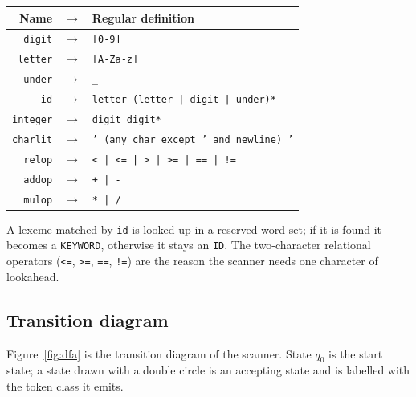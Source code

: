 \documentclass[11pt]{article}
\begin{document}
\begin{center}
\begin{tabular}{@{}rcl@{}}
\toprule
\textbf{Name} & $\rightarrow$ & \textbf{Regular definition}\\
\midrule
\texttt{digit}    & $\rightarrow$ & \texttt{[0-9]}\\
\texttt{letter}   & $\rightarrow$ & \texttt{[A-Za-z]}\\
\texttt{under}    & $\rightarrow$ & \texttt{\_}\\
\texttt{id}       & $\rightarrow$ & \texttt{letter (letter | digit | under)*}\\
\texttt{integer}  & $\rightarrow$ & \texttt{digit digit*}\\
\texttt{charlit}  & $\rightarrow$ & \texttt{' (any char except ' and newline) '}\\
\texttt{relop}    & $\rightarrow$ & \texttt{< | <= | > | >= | == | !=}\\
\texttt{addop}    & $\rightarrow$ & \texttt{+ | -}\\
\texttt{mulop}    & $\rightarrow$ & \texttt{* | /}\\
\bottomrule
\end{tabular}
\end{center}

\noindent
A lexeme matched by \texttt{id} is looked up in a reserved-word set; if it is
found it becomes a \texttt{KEYWORD}, otherwise it stays an \texttt{ID}. The
two-character relational operators (\texttt{<=}, \texttt{>=}, \texttt{==},
\texttt{!=}) are the reason the scanner needs one character of lookahead.

\subsection{Transition diagram}
Figure~\ref{fig:dfa} is the transition diagram of the scanner. State $q_0$ is
the start state; a state drawn with a double circle is an accepting state and
is labelled with the token class it emits.
\end{document}
